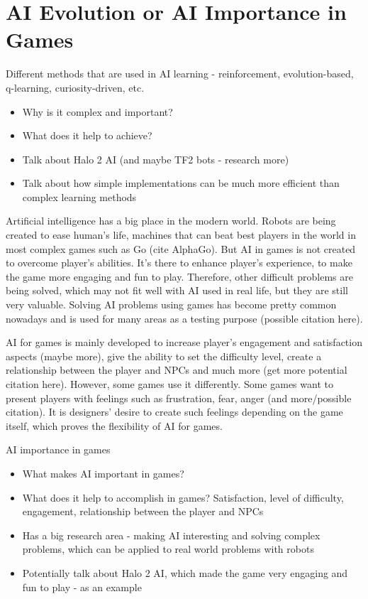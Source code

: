 \documentclass[journal]{IEEEtran}
\begin{document}
\section{AI Evolution or AI Importance in Games}
Different methods that are used in AI learning - reinforcement, evolution-based, q-learning, curiosity-driven, etc. 
\begin{itemize}
	\item Why is it complex and important?
	\item What does it help to achieve? 
	\item Talk about Halo 2 AI (and maybe TF2 bots - research more)
	\item Talk about how simple implementations can be much more efficient than complex learning methods
\end{itemize}

Artificial intelligence has a big place in the modern world. Robots are being created to ease human's life, machines that can beat best players in the world in most complex games such as Go (cite AlphaGo). But AI in games is not created to overcome player's abilities. It's there to enhance player's experience, to make the game more engaging and fun to play. Therefore, other difficult problems are being solved, which may not fit well with AI used in real life, but they are still very valuable. Solving AI problems using games has become pretty common nowadays and is used for many areas as a testing purpose (possible citation here).

AI for games is mainly developed to increase player's engagement and satisfaction aspects (maybe more), give the ability to set the difficulty level, create a relationship between the player and NPCs and much more (get more potential citation here). However, some games use it differently. Some games want to present players with feelings such as frustration, fear, anger (and more/possible citation). It is designers' desire to create such feelings depending on the game itself, which proves the flexibility of AI for games.

AI importance in games
\begin{itemize}
	\item What makes AI important in games?
	\item What does it help to accomplish in games? Satisfaction, level of difficulty, engagement, relationship between the player and NPCs
	\item Has a big research area - making AI interesting and solving complex problems, which can be applied to real world problems with robots
	\item Potentially talk about Halo 2 AI, which made the game very engaging and fun to play - as an example
\end{itemize}
\end{document}
